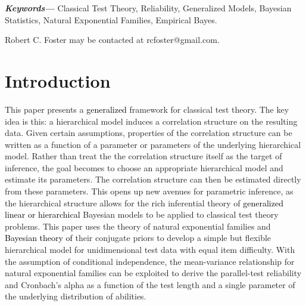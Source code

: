 \documentclass[12pt,epsfig]{article}
\providecommand{\keywords}[1]
{
  \small	
  \textbf{\textit{Keywords---}} #1
}
\newcommand{\change}[1]{\textcolor{black}{#1}}
\newcommand{\changed}[1]{\textcolor{black}{#1}}
\begin{document}
\keywords{Classical Test Theory, Reliability, Generalized Models, Bayesian Statistics, Natural Exponential Families, Empirical Bayes.}

\vfill

\noindent Robert C. Foster may be contacted at rcfoster@gmail.com.



\newpage




\section{Introduction}


This paper presents a \change{generalized} framework for classical test theory. The key idea is this: a hierarchical model induces a correlation structure on the resulting data. Given certain assumptions, properties of the correlation structure can be written as a function of a parameter or parameters of the underlying hierarchical model. Rather than treat the the correlation structure itself as the target of inference, the goal becomes to choose an appropriate hierarchical model and estimate its parameters. The correlation structure can then be estimated directly from these parameters. This opens up new avenues for parametric inference, as the hierarchical structure allows for the rich inferential theory of \change{generalized linear or hierarchical} Bayesian models to be applied to classical test theory problems. This paper uses the theory of natural exponential families and \changed{Bayesian theory of} their conjugate priors to develop a simple but flexible hierarchical model for unidimensional test data with equal item difficulty. With the assumption of conditional independence, the mean-variance relationship for natural exponential families can be exploited to derive the parallel-test reliability and Cronbach's alpha as a function of the test length and a single parameter of the underlying distribution of abilities. 

\end{document}
